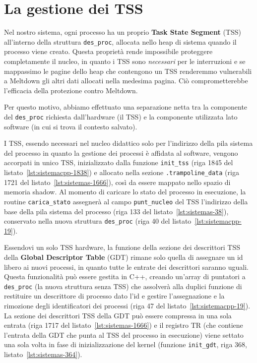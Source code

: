 \section{La gestione dei TSS}
Nel nostro sistema, ogni processo ha un proprio \textbf{Task State Segment} (TSS) all'interno della struttura \texttt{des\_proc}, allocata nello heap di sistema quando il processo viene creato.
Questa proprietà rende impossibile proteggere completamente il nucleo, in quanto i TSS sono \emph{necessari} per le interruzioni e se mappassimo le pagine dello heap che contengono un TSS renderemmo vulnerabili a Meltdown gli altri dati allocati nella medesima pagina.
Ciò comprometterebbe l'efficacia della protezione contro Meltdown.

Per questo motivo, abbiamo effettuato una separazione netta tra la componente del \texttt{des\_proc} richiesta dall'hardware (il TSS) e la componente utilizzata lato software (in cui si trova il contesto salvato).

I TSS, essendo necessari nel nucleo didattico solo per l'indirizzo della pila sistema del processo in quanto la gestione dei processi è affidata al software, vengono accorpati in unico TSS, inizializzato dalla funzione \texttt{init\_tss} (riga 1845 del listato~\vref{lst:sistemacpp-1838}) e allocato nella sezione \texttt{.trampoline\_data} (riga 1721 del listato~\vref{lst:sistemas-1666}), così da essere mappato nello spazio di memoria shadow.
Al momento di caricare lo stato del processo in esecuzione, la routine \texttt{carica\_stato} assegnerà al campo \texttt{punt\_nucleo} del TSS l'indirizzo della base della pila sistema del processo (riga 133 del listato~\vref{lst:sistemas-38}), conservato nella nuova struttura \texttt{des\_proc} (riga 40 del listato~\vref{lst:sistemacpp-19}).

Essendovi un solo TSS hardware, la funzione della sezione dei descrittori TSS della \textbf{Global Descriptor Table} (GDT) rimane solo quella di assegnare un id libero ai nuovi processi, in quanto tutte le entrate dei descrittori saranno uguali.
Questa funzionalità può essere gestita in C++, creando un'array di puntatori a \texttt{des\_proc} (la nuova struttura senza TSS) che assolverà alla duplici funzione di restituire un descrittore di processo dato l'id e gestire l'assegnazione e la rimozione degli identificatori dei processi (riga 47 del listato~\ref{lst:sistemacpp-19}).
La sezione dei descrittori TSS della GDT può essere compressa in una sola entrata (riga 1717 del listato~\vref{lst:sistemas-1666}) e il registro TR (che contiene l'entrata della GDT che punta al TSS del processo in esecuzione) viene settato una sola volta in fase di inizializzazione del kernel (funzione \texttt{init\_gdt}, riga 368, listato~\vref{lst:sistemas-364}).

